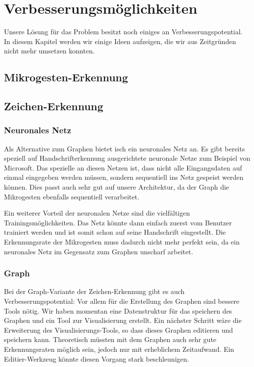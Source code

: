 \chapter{Verbesserungsmöglichkeiten}
Unsere Lösung für das Problem besitzt noch einiges an Verbesserungspotential. In diesem Kapitel werden wir einige Ideen aufzeigen, die wir aus Zeitgründen nicht mehr umsetzen konnten.

\section{Mikrogesten-Erkennung}


\section{Zeichen-Erkennung}
\subsection{Neuronales Netz}
Als Alternative zum Graphen bietet isch ein neuronales Netz an. Es gibt bereits speziell auf Handschrifterkennung ausgerichtete neuronale Netze zum Beispiel von Microsoft. Das spezielle an diesen Netzen ist, dass nicht alle Eingangsdaten auf einmal eingegeben werden müssen, sondern sequentiell ins Netz gespeist werden können. Dies passt auch sehr gut auf unsere Architektur, da der Graph die Mikrogesten ebenfalls sequentiell verarbeitet.

Ein weiterer Vorteil der neuronalen Netze sind die vielfältigen Trainingsmöglichkeiten. Das Netz könnte dann einfach zuerst vom Benutzer trainiert werden und ist somit schon auf seine Handschrift eingestellt. Die Erkennungsrate der Mikrogesten muss dadurch nicht mehr perfekt sein, da ein neuronales Netz im Gegensatz zum Graphen unscharf arbeitet. 

\subsection{Graph}
Bei der Graph-Variante der Zeichen-Erkennung gibt es auch Verbesserungspotential: Vor allem für die Erstellung des Graphen sind bessere Tools nötig. Wir haben momentan eine Datenstruktur für das speichern des Graphen und ein Tool zur Visualisierung erstellt. Ein nächster Schritt wäre die Erweiterung des Visualisierungs-Tools, so dass dieses Graphen editieren und speichern kann. Theoretisch müssten mit dem Graphen auch sehr gute Erkennungsraten möglich sein, jedoch nur mit erheblichem Zeitaufwand. Ein Editier-Werkzeug könnte diesen Vorgang stark beschleunigen.

